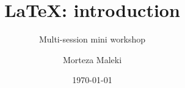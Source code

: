 \documentclass[9pt]{beamer}
\title{\LaTeX: introduction}
\subtitle{Multi-session mini workshop}
\author{Morteza Maleki}
\institute{Tarbiat Modares University}
\date{\today}
\begin{document}
    
    \begin{frame}
        \titlepage
    \end{frame}
    
    

    

	


	

    
   	
    
    
    
	
\end{document}

